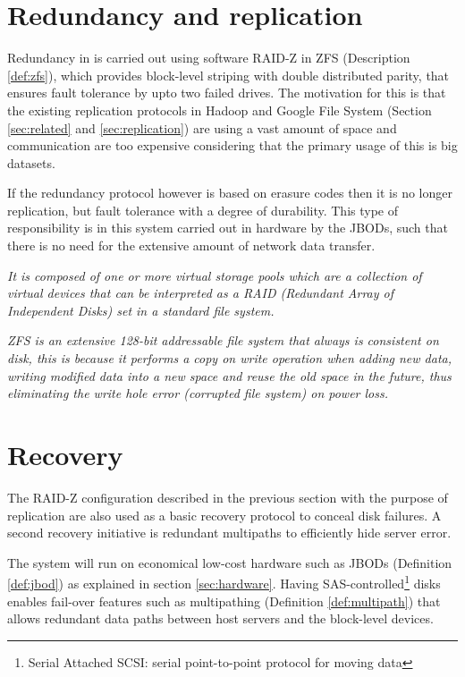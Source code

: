 \section{Redundancy and replication}
Redundancy in \CodeName is carried out using \eg software RAID-Z in ZFS (Description \ref{def:zfs}), which provides block-level striping with double distributed parity, that ensures fault tolerance by upto two failed drives. The motivation for this is that the existing replication protocols in \eg Hadoop and Google File System (Section \ref{sec:related} and \ref{sec:replication}) are using a vast amount of space and communication are too expensive considering that the primary usage of this is big datasets.
\newline

If the redundancy protocol however is based on erasure codes then it is no longer replication, but fault tolerance with a degree of durability. This type of responsibility is in this system carried out in hardware by the JBODs, such that there is no need for the extensive amount of network data transfer.

\begin{definition}[ZFS] \label{def:zfs}
\textit{It is composed of one or more virtual storage pools which are a collection of virtual devices that can be interpreted as a RAID (Redundant Array of Independent Disks) set in a standard file system.}
\newline

\textit{ZFS is an extensive 128-bit addressable file system that always is consistent on disk, this is because it performs a copy on write operation when adding new data, \ie writing modified data into a new space and reuse the old space in the future, thus eliminating the write hole error (corrupted file system) \eg on power loss.}
\end{definition}

\section{Recovery} \label{sec:recovery}
The RAID-Z configuration described in the previous section with the purpose of replication are also used as a basic recovery protocol to conceal disk failures. A second recovery initiative is redundant multipaths to efficiently hide server error.
\newline

The system will run on economical low-cost hardware such as JBODs (Definition \ref{def:jbod}) as explained in section \ref{sec:hardware}. Having SAS-controlled\footnote{Serial Attached SCSI: serial point-to-point protocol for moving data} disks enables fail-over features such as multipathing (Definition \ref{def:multipath}) that allows redundant data paths between host servers and the block-level devices.

